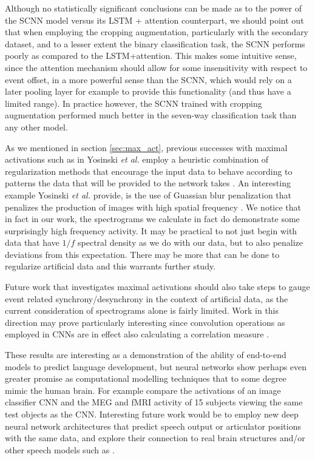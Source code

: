 \documentclass[fleqn,10pt]{wlscirep}
\begin{document}
Although no statistically significant conclusions can be made as to the power of the SCNN model versus its LSTM + attention counterpart, we should point out that when employing the cropping augmentation, particularly with the secondary dataset, and to a lesser extent the binary classification task, the SCNN performs poorly as compared to the LSTM+attention. This makes some intuitive sense, since the attention mechanism should allow for some insensitivity with respect to event offset, in a more powerful sense than the SCNN, which would rely on a later pooling layer for example to provide this functionality (and thus have a limited range). In practice however, the SCNN trained with cropping augmentation performed much better in the seven-way classification task than any other model.

As we mentioned in section \ref{sec:max_act}, previous successes with maximal activations such as in Yosinski {\em et al.} employ a heuristic combination of regularization methods that encourage the input data to behave according to patterns the data that will be provided to the network takes \cite{Yosinski2015}. An interesting example Yosinski {\em et al.} provide, is the use of Guassian blur penalization that penalizes the production of images with high spatial frequency \cite{Yosinski2015}. We notice that in fact in our work, the spectrograms we calculate in fact do demonstrate some surprisingly high frequency activity. It may be practical to not just begin with data that have $1/f$ spectral density as we do with our data, but to also penalize deviations from this expectation. There may be more that can be done to regularize artificial data and this warrants further study.

Future work that investigates maximal activations should also take steps to gauge event related synchrony/desynchrony in the context of artificial data, as the current consideration of spectrograms alone is fairly limited. Work in this direction may prove particularly interesting since convolution operations as employed in CNNs are in effect also calculating a correlation measure \cite{GravesRNNBook}.

These results are interesting as a demonstration of the ability of end-to-end models to predict language development, but neural networks show perhaps even greater promise as computational modelling techniques that to some degree mimic the human brain. For example \cite{cichy2016} compare the activations of an image classifier CNN and the MEG and fMRI activity of 15 subjects viewing the same test objects as the CNN. Interesting future work would be to employ new deep neural network architectures that predict speech output or articulator positions with the same data, and explore their connection to real brain structures and/or other speech models such as \cite{Guenther2005}.
\end{document}
